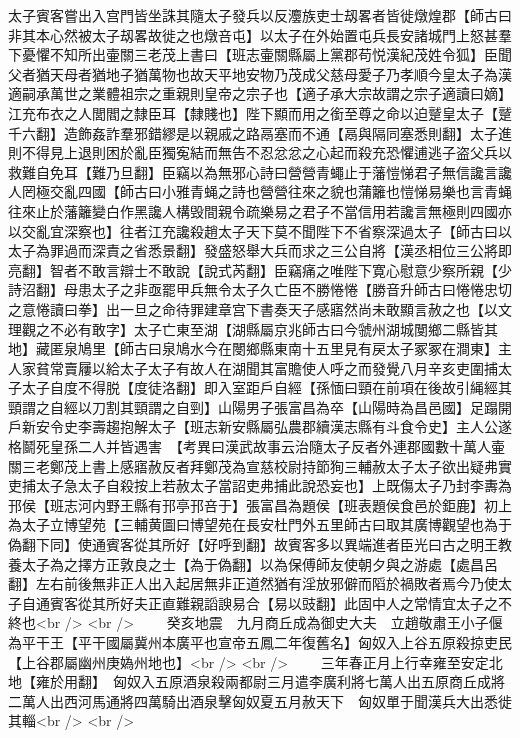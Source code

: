 太子賓客嘗出入宫門皆坐誅其隨太子發兵以反灋族吏士刼畧者皆徙燉煌郡【師古曰非其本心然被太子刼畧故徙之也燉咅屯】以太子在外始置屯兵長安諸城門上怒甚羣下憂懼不知所出壷關三老茂上書曰【班志壷關縣屬上黨郡苟悦漢紀茂姓令狐】臣聞父者猶天母者猶地子猶萬物也故天平地安物乃茂成父慈母愛子乃孝順今皇太子為漢適嗣承萬世之業體祖宗之重親則皇帝之宗子也【適子承大宗故謂之宗子適讀曰嫡】江充布衣之人閭閻之隸臣耳【隸賤也】陛下顯而用之銜至尊之命以迫蹵皇太子【蹵千六翻】造飾姦詐羣邪錯繆是以親戚之路鬲塞而不通【鬲與隔同塞悉則翻】太子進則不得見上退則困於亂臣獨寃結而無告不忍忿忿之心起而殺充恐懼逋逃子盗父兵以救難自免耳【難乃旦翻】臣竊以為無邪心詩曰營營青蠅止于藩愷悌君子無信讒言讒人罔極交亂四國【師古曰小雅青蝇之詩也營營往來之貌也蒲籬也愷悌易樂也言青蝇往來止於藩籬變白作黑讒人構毁間親令疏樂易之君子不當信用若讒言無極則四國亦以交亂宜深察也】往者江充讒殺趙太子天下莫不聞陛下不省察深過太子【師古曰以太子為罪過而深責之省悉景翻】發盛怒舉大兵而求之三公自將【漢丞相位三公將即亮翻】智者不敢言辯士不敢說【說式芮翻】臣竊痛之唯陛下寛心慰意少察所親【少詩沼翻】母患太子之非亟罷甲兵無令太子久亡臣不勝惓惓【勝音升師古曰惓惓忠切之意惓讀曰拳】出一旦之命待罪建章宫下書奏天子感寤然尚未敢顯言赦之也【以文理觀之不必有敢字】太子亡東至湖【湖縣屬京兆師古曰今虢州湖城閺鄉二縣皆其地】藏匿泉鳩里【師古曰泉鳩水今在閿鄉縣東南十五里見有戻太子冢冢在澗東】主人家貧常賣屨以給太子太子有故人在湖聞其富贍使人呼之而發覺八月辛亥吏圍捕太子太子自度不得脱【度徒洛翻】即入室距戶自經【孫愐曰頸在前項在後故引䋲經其頸謂之自經以刀割其頸謂之自剄】山陽男子張富昌為卒【山陽時為昌邑國】足蹋開戶新安令史李壽趨抱解太子【班志新安縣屬弘農郡續漢志縣有斗食令史】主人公遂格鬬死皇孫二人并皆遇害　【考異曰漢武故事云治隨太子反者外連郡國數十萬人壷關三老鄭茂上書上感寤赦反者拜鄭茂為宣慈校尉持節狥三輔赦太子太子欲出疑弗實吏捕太子急太子自殺按上若赦太子當詔吏弗捕此說恐妄也】上既傷太子乃封李夀為邘侯【班志河内野王縣有邘亭邘咅于】張富昌為題侯【班表題侯食邑於鉅鹿】初上為太子立博望苑【三輔黄圖曰博望苑在長安杜門外五里師古曰取其廣博觀望也為于偽翻下同】使通賓客從其所好【好呼到翻】故賓客多以異端進者臣光曰古之明王教養太子為之擇方正敦良之士【為于偽翻】以為保傅師友使朝夕與之游處【處昌呂翻】左右前後無非正人出入起居無非正道然猶有淫放邪僻而䧟於禍敗者焉今乃使太子自通賓客從其所好夫正直難親謟諛易合【易以豉翻】此固中人之常情宜太子之不終也<br />
<br />
　　癸亥地震　九月商丘成為御史大夫　立趙敬肅王小子偃為平干王【平干國屬冀州本廣平也宣帝五鳳二年復舊名】匈奴入上谷五原殺掠吏民【上谷郡屬幽州庚媯州地也】<br />
<br />
　　三年春正月上行幸雍至安定北地【雍於用翻】　匈奴入五原酒泉殺兩都尉三月遣李廣利將七萬人出五原商丘成將二萬人出西河馬通將四萬騎出酒泉擊匈奴夏五月赦天下　匈奴單于聞漢兵大出悉徙其輜<br />
<br />
